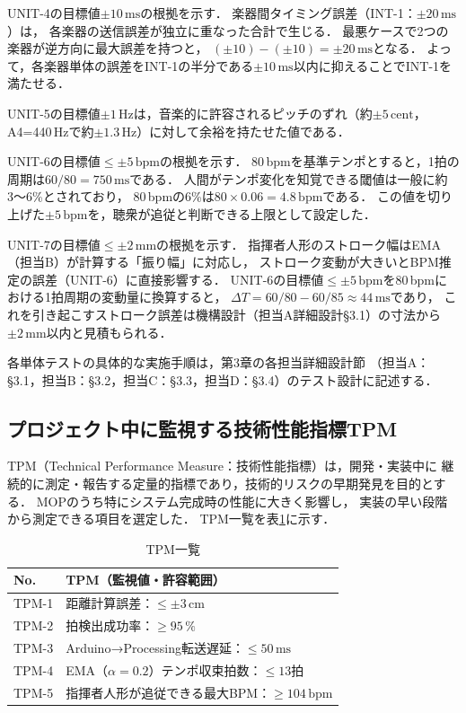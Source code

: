 \documentclass[lualatex,book,paper=a4paper,jafontsize=11.5pt,jafontscale=1.05,oneside]{jlreq}
\begin{document}
UNIT-4の目標値$\pm 10\,\mathrm{ms}$の根拠を示す．
楽器間タイミング誤差（INT-1：$\pm 20\,\mathrm{ms}$）は，
各楽器の送信誤差が独立に重なった合計で生じる．
最悪ケースで2つの楽器が逆方向に最大誤差を持つと，
$(\pm 10) - (\pm 10) = \pm 20\,\mathrm{ms}$となる．
よって，各楽器単体の誤差をINT-1の半分である$\pm 10\,\mathrm{ms}$以内に抑えることでINT-1を満たせる．

UNIT-5の目標値$\pm 1\,\mathrm{Hz}$は，音楽的に許容されるピッチのずれ（約$\pm 5\,\mathrm{cent}$，
A4=440\,Hzで約$\pm 1.3\,\mathrm{Hz}$\cite{jnd1974}）に対して余裕を持たせた値である．

UNIT-6の目標値$\leq \pm 5\,\mathrm{bpm}$の根拠を示す．
80\,bpmを基準テンポとすると，1拍の周期は$60/80 = 750\,\mathrm{ms}$である．
人間がテンポ変化を知覚できる閾値は一般に約3〜6\%とされており，
80\,bpmの6\%は$80 \times 0.06 = 4.8\,\mathrm{bpm}$である．
この値を切り上げた$\pm 5\,\mathrm{bpm}$を，聴衆が追従と判断できる上限として設定した．

UNIT-7の目標値$\leq \pm 2\,\mathrm{mm}$の根拠を示す．
指揮者人形のストローク幅はEMA（担当B）が計算する「振り幅」に対応し，
ストローク変動が大きいとBPM推定の誤差（UNIT-6）に直接影響する．
UNIT-6の目標値$\leq \pm 5\,\mathrm{bpm}$を80\,bpmにおける1拍周期の変動量に換算すると，
$\Delta T = 60/80 - 60/85 \approx 44\,\mathrm{ms}$であり，
これを引き起こすストローク誤差は機構設計（担当A詳細設計§3.1）の寸法から$\pm 2\,\mathrm{mm}$以内と見積もられる．

各単体テストの具体的な実施手順は，第3章の各担当詳細設計節
（担当A：§3.1，担当B：§3.2，担当C：§3.3，担当D：§3.4）のテスト設計に記述する．

\subsection{プロジェクト中に監視する技術性能指標TPM}

TPM（Technical Performance Measure：技術性能指標）は，開発・実装中に
継続的に測定・報告する定量的指標であり，技術的リスクの早期発見を目的とする．
MOPのうち特にシステム完成時の性能に大きく影響し，
実装の早い段階から測定できる項目を選定した．
TPM一覧を表\ref{tab:tpm}に示す．

\begin{table}[H]
  \centering
  \caption{TPM一覧}
  \label{tab:tpm}
  \begin{tabularx}{\linewidth}{lX}
    \toprule
    No. & TPM（監視値・許容範囲） \\
    \midrule
    TPM-1 & 距離計算誤差：$\leq \pm 3\,\mathrm{cm}$ \\
    TPM-2 & 拍検出成功率：$\geq 95\,\%$ \\
    TPM-3 & Arduino→Processing転送遅延：$\leq 50\,\mathrm{ms}$ \\
    TPM-4 & EMA（$\alpha=0.2$）テンポ収束拍数：$\leq 13$拍 \\
    TPM-5 & 指揮者人形が追従できる最大BPM：$\geq 104\,\mathrm{bpm}$ \\
    \bottomrule
  \end{tabularx}
\end{table}
\end{document}
